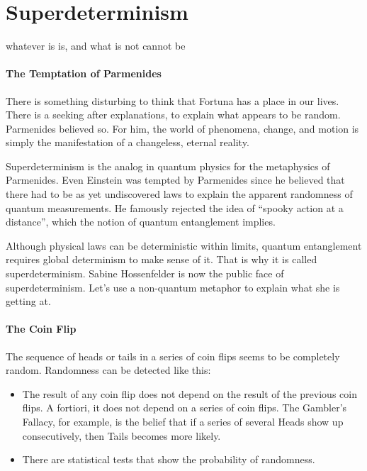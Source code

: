 \section{Superdeterminism}

\begin{quotex}
whatever is is, and what is not cannot be
\end{quotex}


\paragraph{The Temptation of Parmenides}

There is something disturbing to think that Fortuna has a place in our lives. There is a seeking after explanations, to explain what appears to be random. Parmenides believed so. For him, the world of phenomena, change, and motion is simply the manifestation of a changeless, eternal reality.

Superdeterminism is the analog in quantum physics for the metaphysics of Parmenides. Even Einstein was tempted by Parmenides since he believed that there had to be as yet undiscovered laws to explain the apparent randomness of quantum measurements. He famously rejected the idea of ``spooky action at a distance'', which the notion of quantum entanglement implies.

Although physical laws can be deterministic within limits, quantum entanglement requires global determinism to make sense of it. That is why it is called superdeterminism. Sabine Hossenfelder is now the public face of superdeterminism. Let's use a non-quantum metaphor to explain what she is getting at.

\paragraph{The Coin Flip}


The sequence of heads or tails in a series of coin flips seems to be completely random. Randomness can be detected like this:

\begin{itemize}

\item The result of any coin flip does not depend on the result of the previous coin flips. A fortiori, it does not depend on a series of coin flips. The Gambler's Fallacy, for example, is the belief that if a series of several Heads show up consecutively, then Tails becomes more likely.
\item There are statistical tests that show the probability of randomness.
\end{itemize}



